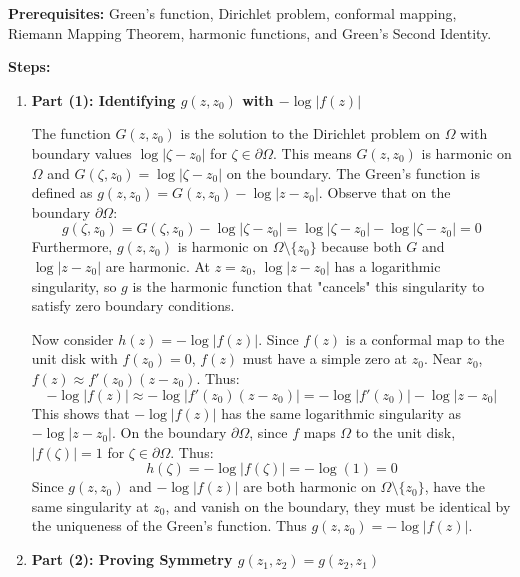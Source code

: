 \begin{solution}
\textbf{Prerequisites:} 
Green's function, Dirichlet problem, conformal mapping, Riemann Mapping Theorem, harmonic functions, and Green's Second Identity.

\par\vspace{\baselineskip}
\textbf{Steps:}

\begin{enumerate}
    \item \textbf{Part (1): Identifying $g(z, z_0)$ with $-\log|f(z)|$}

    The function $G(z, z_0)$ is the solution to the Dirichlet problem on $\Omega$ with boundary values $\log |\zeta - z_0|$ for $\zeta \in \partial\Omega$. This means $G(z, z_0)$ is harmonic on $\Omega$ and $G(\zeta, z_0) = \log |\zeta - z_0|$ on the boundary.
    The Green's function is defined as $g(z, z_0) = G(z, z_0) - \log |z - z_0|$.
    Observe that on the boundary $\partial\Omega$:
    \[
    g(\zeta, z_0) = G(\zeta, z_0) - \log |\zeta - z_0| = \log |\zeta - z_0| - \log |\zeta - z_0| = 0
    \]
    Furthermore, $g(z, z_0)$ is harmonic on $\Omega \setminus \{z_0\}$ because both $G$ and $\log|z-z_0|$ are harmonic. At $z=z_0$, $\log|z-z_0|$ has a logarithmic singularity, so $g$ is the harmonic function that "cancels" this singularity to satisfy zero boundary conditions.

    Now consider $h(z) = -\log |f(z)|$.
    Since $f(z)$ is a conformal map to the unit disk with $f(z_0) = 0$, $f(z)$ must have a simple zero at $z_0$. Near $z_0$, $f(z) \approx f'(z_0)(z-z_0)$. Thus:
    \[
    -\log |f(z)| \approx -\log |f'(z_0)(z-z_0)| = -\log |f'(z_0)| - \log |z-z_0|
    \]
    This shows that $-\log |f(z)|$ has the same logarithmic singularity as $-\log |z-z_0|$.
    On the boundary $\partial\Omega$, since $f$ maps $\Omega$ to the unit disk, $|f(\zeta)| = 1$ for $\zeta \in \partial\Omega$. Thus:
    \[
    h(\zeta) = -\log |f(\zeta)| = -\log(1) = 0
    \]
    Since $g(z, z_0)$ and $-\log |f(z)|$ are both harmonic on $\Omega \setminus \{z_0\}$, have the same singularity at $z_0$, and vanish on the boundary, they must be identical by the uniqueness of the Green's function. Thus $g(z, z_0) = -\log |f(z)|$.

    \item \textbf{Part (2): Proving Symmetry $g(z_1, z_2) = g(z_2, z_1)$}


\end{enumerate}
\end{solution}
